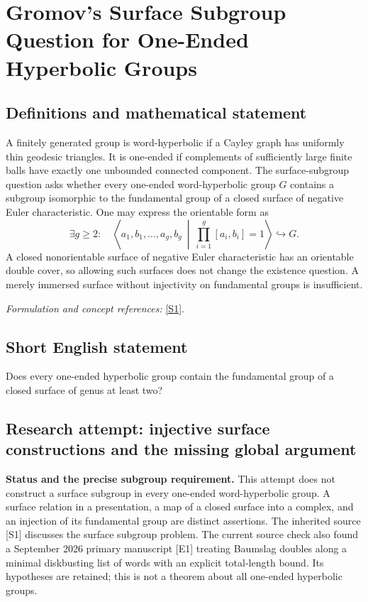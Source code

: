\documentclass[11pt]{article}
\begin{document}
\section*{\texorpdfstring{Gromov's Surface Subgroup Question for One-Ended Hyperbolic Groups}{Gromov's Surface Subgroup Question for One-Ended Hyperbolic Groups}}\label{323}
\subsection{Definitions and mathematical statement}
A finitely generated group is word-hyperbolic if a Cayley graph has uniformly thin geodesic triangles. It is one-ended if complements of sufficiently large finite balls have exactly one unbounded connected component. The surface-subgroup question asks whether every one-ended word-hyperbolic group $G$ contains a subgroup isomorphic to the fundamental group of a closed surface of negative Euler characteristic. One may express the orientable form as
\[
 \exists g\ge2:\quad
 \left\langle a_1,b_1,\ldots,a_g,b_g\ \middle|\
 \prod_{i=1}^g[a_i,b_i]=1\right\rangle\hookrightarrow G.
\]
A closed nonorientable surface of negative Euler characteristic has an orientable double cover, so allowing such surfaces does not change the existence question. A merely immersed surface without injectivity on fundamental groups is insufficient.
\par\smallskip\textit{Formulation and concept references:} \href{https://research-repository.st-andrews.ac.uk/bitstream/handle/10023/26667/Gardam_2022_MRL_SGC_AAM.pdf?sequence=1}{[S1]}.

\subsection{Short English statement}
Does every one-ended hyperbolic group contain the fundamental group of a closed surface of genus at least two?
\subsection{Research attempt: injective surface constructions and the missing global argument}
\textbf{Status and the precise subgroup requirement.} This attempt does not construct a surface subgroup in every one-ended word-hyperbolic group. A surface relation in a presentation, a map of a closed surface into a complex, and an injection of its fundamental group are distinct assertions. The inherited source [S1] discusses the surface subgroup problem. The current source check also found a September 2026 primary manuscript [E1] treating Baumslag doubles along a minimal diskbusting list of words with an explicit total-length bound. Its hypotheses are retained; this is not a theorem about all one-ended hyperbolic groups.
\end{document}
